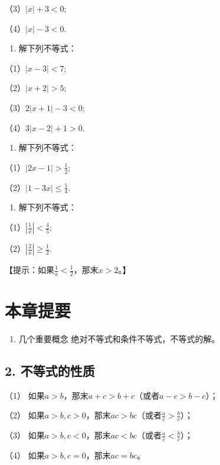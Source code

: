 （3）\(|x| + 3 < 0;\)

（4）\(|x| - 3 < 0.\)

\begin{enumerate}[start=2]
\item
  解下列不等式：
\end{enumerate}

（1）\(|x-3|<7;\)

（2）\(|x+2|>5;\)

（3）\(2|x + 1| - 3 < 0;\)

（4）\(3|x - 2| + 1 > 0.\)

\begin{enumerate}[start=3]
\item
  解下列不等式：
\end{enumerate}

（1）\(|2x-1|>\frac{1}{2};\)

（2）\(|1-3x|\leqslant\frac{1}{4}.\)

\begin{enumerate}[start=4]
\item
  解下列不等式：
\end{enumerate}

（1）\(\left|\frac{1}{x}\right|<\frac{4}{5};\)

（2）\(\left|\frac{2}{x}\right|\geqslant\frac{1}{2}.\)

【提示：如果\(\frac{1}{a} < \frac{1}{2}\)，那末\(x > 2\)。】

\section{本章提要}

\begin{enumerate}
\item
  几个重要概念 绝对不等式和条件不等式，不等式的解。
\end{enumerate}

\subsection{2. 不等式的性质}

（1） 如果\(a > b\)，那末\(a + c > b + c\)（或者\(a - c > b - c\)）；

（2）
如果\(a > b, c > 0\)，那末\(ac > bc\)（或者\(\frac{a}{c} > \frac{b}{c}\)）；

（3）
如果\(a > b, c < 0\)，那末\(ac < bc\)（或者\(\frac{a}{c} < \frac{b}{c}\)）；

（4） 如果\(a > b, c = 0\)，那末\(ac = bc\)。

